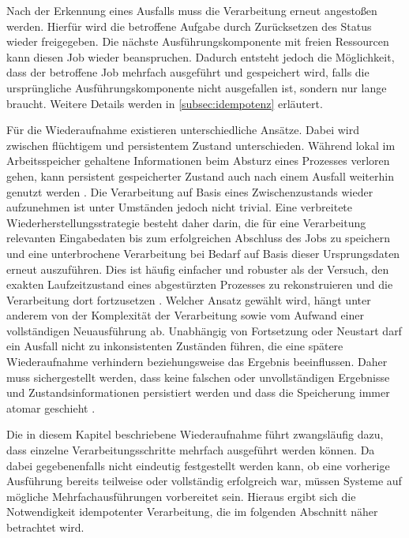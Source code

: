 Nach der Erkennung eines Ausfalls muss die Verarbeitung erneut angestoßen werden.
Hierfür wird die betroffene Aufgabe durch Zurücksetzen des Status wieder freigegeben.
Die nächste Ausführungskomponente mit freien Ressourcen kann diesen Job wieder beanspruchen.
Dadurch entsteht jedoch die Möglichkeit, dass der betroffene Job mehrfach ausgeführt und gespeichert wird, falls die ursprüngliche
Ausführungskomponente nicht ausgefallen ist, sondern nur lange braucht.
Weitere Details werden in \cref{subsec:idempotenz} erläutert.

Für die Wiederaufnahme existieren unterschiedliche Ansätze.
Dabei wird zwischen flüchtigem und persistentem Zustand unterschieden.
Während lokal im Arbeitsspeicher gehaltene Informationen beim Absturz eines Prozesses verloren gehen, kann persistent
gespeicherter Zustand auch nach einem Ausfall weiterhin genutzt werden
\parencite[Kap.~11 Abschnitt \glqq Rebuilding state after a failure\grqq]{kleppmann_designing_2017}.
Die Verarbeitung auf Basis eines Zwischenzustands wieder aufzunehmen ist unter Umständen jedoch nicht trivial.
Eine verbreitete Wiederherstellungsstrategie besteht daher darin, die für eine Verarbeitung relevanten Eingabedaten bis zum erfolgreichen
Abschluss des Jobs zu speichern und eine unterbrochene Verarbeitung bei Bedarf auf Basis dieser Ursprungsdaten erneut auszuführen.
Dies ist häufig einfacher und robuster als der Versuch, den exakten Laufzeitzustand eines abgestürzten Prozesses zu rekonstruieren
und die Verarbeitung dort fortzusetzen \parencite[Kap.~17.3]{bass_software_2021}.
Welcher Ansatz gewählt wird, hängt unter anderem von der Komplexität der Verarbeitung sowie vom Aufwand einer vollständigen Neuausführung ab.
Unabhängig von Fortsetzung oder Neustart darf ein Ausfall nicht zu inkonsistenten Zuständen führen, die eine spätere
Wiederaufnahme verhindern beziehungsweise das Ergebnis beeinflussen.
Daher muss sichergestellt werden, dass keine falschen oder unvollständigen Ergebnisse und Zustandsinformationen persistiert werden
und dass die Speicherung immer atomar geschieht \parencite[Kap.~4.2 Abschnitt \glqq Recover from Faults\grqq]{bass_software_2021}.

Die in diesem Kapitel beschriebene Wiederaufnahme führt zwangsläufig dazu, dass einzelne Verarbeitungsschritte mehrfach
ausgeführt werden können.
Da dabei gegebenenfalls nicht eindeutig festgestellt werden kann, ob eine vorherige Ausführung bereits teilweise oder vollständig
erfolgreich war, müssen Systeme auf mögliche Mehrfachausführungen vorbereitet sein.
Hieraus ergibt sich die Notwendigkeit idempotenter Verarbeitung, die im folgenden Abschnitt näher betrachtet wird.

